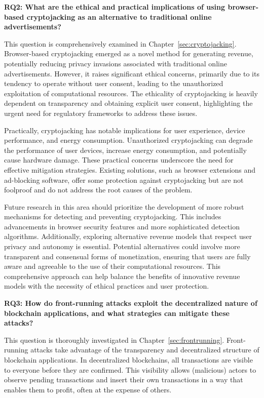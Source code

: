 \textbf{RQ2: What are the ethical and practical implications of using browser-based cryptojacking as an alternative to traditional online advertisements?}

This question is comprehensively examined in Chapter~\ref{sec:cryptojacking}. Browser-based cryptojacking emerged as a novel method for generating revenue, potentially reducing privacy invasions associated with traditional online advertisements. However, it raises significant ethical concerns, primarily due to its tendency to operate without user consent, leading to the unauthorized exploitation of computational resources. The ethicality of cryptojacking is heavily dependent on transparency and obtaining explicit user consent, highlighting the urgent need for regulatory frameworks to address these issues.

Practically, cryptojacking has notable implications for user experience, device performance, and energy consumption. Unauthorized cryptojacking can degrade the performance of user devices, increase energy consumption, and potentially cause hardware damage. These practical concerns underscore the need for effective mitigation strategies. Existing solutions, such as browser extensions and ad-blocking software, offer some protection against cryptojacking but are not foolproof and do not address the root causes of the problem.

Future research in this area should prioritize the development of more robust mechanisms for detecting and preventing cryptojacking. This includes advancements in browser security features and more sophisticated detection algorithms. Additionally, exploring alternative revenue models that respect user privacy and autonomy is essential. Potential alternatives could involve more transparent and consensual forms of monetization, ensuring that users are fully aware and agreeable to the use of their computational resources. This comprehensive approach can help balance the benefits of innovative revenue models with the necessity of ethical practices and user protection.



\textbf{RQ3: How do front-running attacks exploit the decentralized nature of blockchain applications, and what strategies can mitigate these attacks?}

This question is thoroughly investigated in Chapter~\ref{sec:frontrunning}. Front-running attacks take advantage of the transparency and decentralized structure of blockchain applications. In decentralized blockchains, all transactions are visible to everyone before they are confirmed. This visibility allows (malicious) actors to observe pending transactions and insert their own transactions in a way that enables them to profit, often at the expense of others. 

